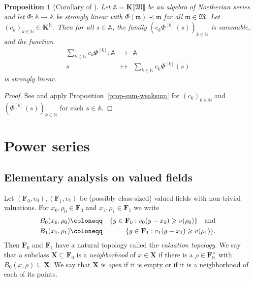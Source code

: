 \documentclass{article}
\newcommand{\assign}{\coloneqq}
\newcommand{\of}{:}
\newcommand{\suchthat}{:}
\newcommand{\tmem}[1]{{\em #1\/}}
\newtheorem{proposition}[theorem]{Proposition}
\theoremstyle{remark}\newtheorem*{convention*}{Convention}
\begin{document}
\begin{proposition}[Corollary of {\cite[Theorem~6.2]{vdH:noeth}}]\label{prop-iterating-operator}
  Let $\mathbb{A}= \mathbf{K} \llbracket
  \mathfrak{M} \rrbracket$ be an algebra of Noetherian series and let $\Phi
  \of \mathbb{A} \longrightarrow \mathbb{A}$ be strongly linear with $\Phi
  (\mathfrak{m}) \prec \mathfrak{m}$ for all $\mathfrak{m} \in \mathfrak{M}$.
  Let $(c_k)_{k \in \mathbb{N}} \in \mathbf{K}^{\mathbb{N}}$. Then for all $s
  \in \mathbb{A}$, the family $(c_k \Phi^{[k]} (s))_{k \in \mathbb{N}}$ is
  summable, and the function
  \begin{eqnarray*}
    \sum_{k \in \mathbb{N}} c_k \Phi^{[k]} \of \mathbb{A} & \longrightarrow &
    \mathbb{A}\\
    s & \longmapsto & \sum_{k \in \mathbb{N}} c_k \Phi^{[k]} (s)
  \end{eqnarray*}
  is strongly linear.
\end{proposition}

\begin{proof}
  See {\cite[Theorem~1.3 and Corollary~1.4]{vdH:dagap}} and apply
  Proposition~\ref{prop-sum-weaksum} for $(c_k)_{k \in \mathbb{N}}$ and $(\Phi^{[k]}
  (s))_{k \in \mathbb{N}}$ for each $s \in \mathbb{A}$.
\end{proof}

\section{Power series}\label{section-power-series}

\subsection{Elementary analysis on valued fields}

Let $(\mathbf{F}_0, v_0), (\mathbf{F}_1, v_1)$ be (possibly class-sized)
valued fields with non-trivial valuations. For $x_0, \rho_0 \in \mathbf{F}_0$
and $x_1, \rho_1 \in \mathbf{F}_1$ we write
\begin{eqnarray*}
  B_0 (x_0, \rho_0) & \assign & \{y \in \mathbf{F}_0 \suchthat v_0 (y - x_0)
  \geqslant v (\rho_0)\} \text{\quad and}\\
  B_1 (x_1, \rho_1) & \assign & \{y \in \mathbf{F}_1 \suchthat v_1 (y - x_1)
  \geqslant v (\rho_1)\} .
\end{eqnarray*}
Then $\mathbf{F}_0$ and $\mathbf{F}_1$ have a natural topology called the
{\tmem{valuation topology}}. We say that a subclass $\mathbf{X} \subseteq
\mathbf{F}_0$ is a {\tmem{neighborhood}}{} of $x \in
\mathbf{X}$ if there is a $\rho \in \mathbf{F}_0^{\times}$ with $B_0 (x, \rho)
\subseteq \mathbf{X}$. We say that $\mathbf{X}$ is {\tmem{open}}{}
if it is empty or if it is a neighborhood of each of its points.
\end{document}
